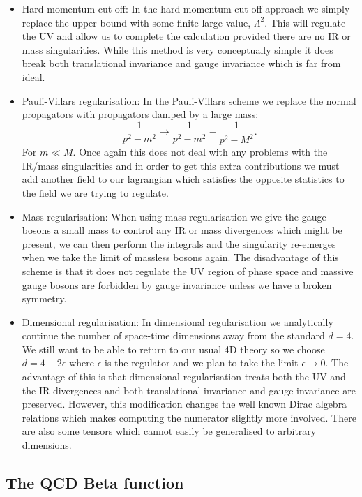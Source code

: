 	\begin{itemize}
	\item Hard momentum cut-off: In the hard momentum cut-off approach we simply replace the upper bound with some finite large value, $\Lambda^2$.  This will regulate the UV and allow us to complete the calculation provided there are no IR or mass singularities.  While this method is very conceptually simple it does break both translational invariance and gauge invariance which is far from ideal.
	\item Pauli-Villars regularisation: In the Pauli-Villars scheme we replace the normal propagators with propagators damped by a large mass:
	      \begin{equation}
	      \frac{1}{p^2-m^2}\rightarrow\frac{1}{p^2-m^2} - \frac{1}{p^2-M^2}.
	      \end{equation}
	      For $m\ll M$.  Once again this does not deal with any problems with the IR/mass singularities and in order to get this extra contributions we must add another field to our lagrangian which satisfies the opposite statistics to the field we are trying to regulate.
	\item Mass regularisation: When using mass regularisation we give the gauge bosons a small mass to control any IR or mass divergences which might be present, we can then perform the integrals and the singularity re-emerges when we take the limit of massless bosons again.  The disadvantage of this scheme is that it does not regulate the UV region of phase space and massive gauge bosons are forbidden by gauge invariance unless we have a broken symmetry.
	\item Dimensional regularisation:  In dimensional regularisation we analytically continue the number of space-time dimensions away from the standard $d=4$.  We still want to be able to return to our usual 4D theory so we choose $d=4-2\epsilon$ where $\epsilon$ is the regulator and we plan to take the limit $\epsilon\rightarrow 0$.  The advantage of this is that dimensional regularisation treats both the UV and the IR divergences and both translational invariance and gauge invariance are preserved.  However, this modification changes the well known Dirac algebra relations which makes computing the numerator slightly more involved.  There are also some tensors which cannot easily be generalised to arbitrary dimensions.
	\end{itemize}

	\subsection{The QCD Beta function}

